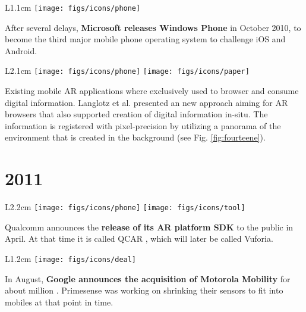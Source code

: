 \documentclass[12pt,a4paper]{article}
\begin{document}
\vspace{0.1in}

\begin{wrapfigure}{L}{1.1cm}
	\vspace{-15pt}	
	\texttt{[image: figs/icons/phone]}
	\vspace{-20pt}		
\end{wrapfigure}
\noindent After several delays, \textbf{Microsoft releases Windows Phone} in October 2010, to become the third major mobile phone operating system to challenge iOS and Android. 
\newpage

\begin{wrapfigure}{L}{2.1cm}
	\vspace{-0pt}	
	\texttt{[image: figs/icons/phone]}
	\texttt{[image: figs/icons/paper]}
	\vspace{-25pt}		
\end{wrapfigure} 
\noindent Existing mobile AR applications where exclusively used to browser and consume digital information. Langlotz et al. presented an new approach aiming for AR browsers that also supported creation of digital information in-situ. The information is registered with pixel-precision by utilizing a panorama of the environment that is created in the background \cite{Langlotz12} (see Fig. \ref{fig:fourteene}).

\vspace{-5pt}
\section*{2011}

\begin{wrapfigure}{L}{2.2cm}
	\vspace{-15pt}	
	\texttt{[image: figs/icons/phone]}
	\texttt{[image: figs/icons/tool]}
	\vspace{-20pt}		
\end{wrapfigure} 
Qualcomm announces the \textbf{release of its AR platform SDK} to the public in April. At that time it is called QCAR , which will later be called Vuforia.

\vspace{0.1in}

\begin{wrapfigure}{L}{1.2cm}
	\vspace{-10pt}	
	\texttt{[image: figs/icons/deal]}
	\vspace{-10pt}		
\end{wrapfigure} 
\noindent In August, \textbf{Google announces the acquisition of Motorola Mobility} for about  million . Primesense was working on shrinking their sensors to fit into mobiles at that point in time.
\end{document}
